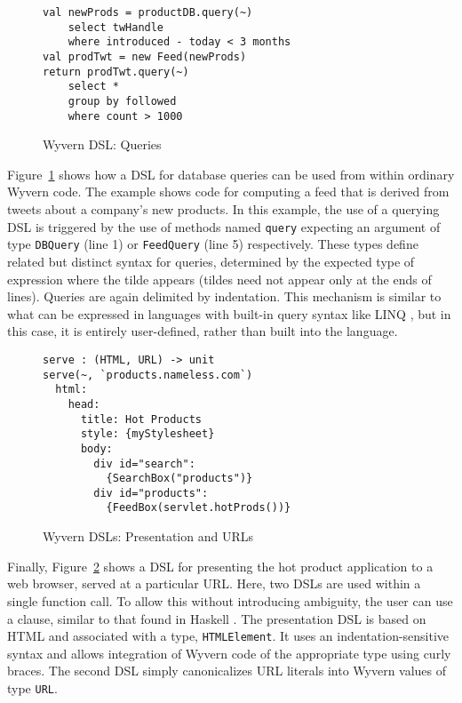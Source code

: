 \begin{figure}
  \centering
  \begin{lstlisting}
val newProds = productDB.query(~)
    select twHandle 
    where introduced - today < 3 months
val prodTwt = new Feed(newProds)
return prodTwt.query(~)
    select *
    group by followed
    where count > 1000
  \end{lstlisting}
  \caption{Wyvern DSL: Queries}
  \label{f:dsl-query}
\end{figure}

Figure~\ref{f:dsl-query} shows how a DSL for database queries can be used from within ordinary Wyvern code.  The example shows code for computing a feed that is derived from tweets about a company's new products.  In this example, the use of a querying DSL is triggered by the use of methods named \lstinline{query} expecting an argument of type \lstinline{DBQuery} (line 1) or \lstinline{FeedQuery} (line 5) respectively.  These types define related but distinct syntax for queries, determined by the expected type of expression where the tilde appears (tildes need not appear only at the ends of lines). Queries are again delimited by indentation. This mechanism is similar to what can be expressed in languages with built-in query syntax like LINQ \cite{mslinq}, but in this case, it is entirely user-defined, rather than built into the language.\begin{figure}
  \centering
  \begin{lstlisting}
serve : (HTML, URL) -> unit
serve(~, `products.nameless.com`) 
  html:
    head:
      title: Hot Products
      style: {myStylesheet}
      body:
        div id="search":
          {SearchBox("products")}
        div id="products":
          {FeedBox(servlet.hotProds())}
  \end{lstlisting}
  \caption{Wyvern DSLs: Presentation and URLs}
  \label{f:dsl-presentation}
\end{figure}

Finally, Figure~\ref{f:dsl-presentation} shows a DSL for presenting the hot product application to a web browser, served at a particular URL. Here, two DSLs are used within a single function call. To allow this without introducing ambiguity, the user can use a  clause, similar to that found in Haskell \cite{jones2003haskell}. The presentation DSL is based on HTML and associated with a type, \lstinline{HTMLElement}. It uses an indentation-sensitive syntax and allows integration of Wyvern code of the appropriate type using curly braces. The second DSL simply canonicalizes URL literals into Wyvern values of type \lstinline{URL}.
